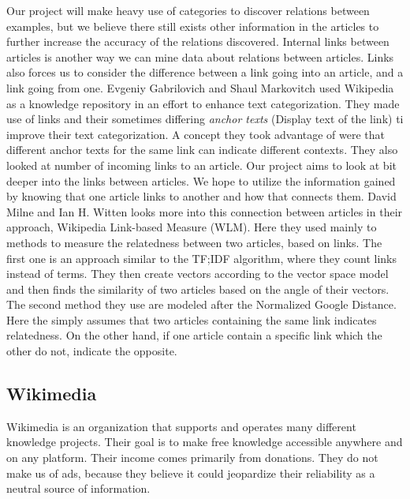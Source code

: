 Our project will make heavy use of categories to discover relations between examples, but we believe there still exists other information in the articles to further increase the accuracy of the relations discovered. Internal links between articles is another way we can mine data about relations between articles. Links also forces us to consider the difference between a link going into an article, and a link going from one. Evgeniy Gabrilovich and Shaul Markovitch used Wikipedia as a knowledge repository in an effort to enhance text categorization\cite{text-cat}. They made use of links and their sometimes differing \textit{anchor texts} (Display text of the link) ti improve their text categorization. A concept they took advantage of were that different anchor texts for the same link can indicate different contexts.  They also looked at number of incoming links to an article. Our project aims to look at bit deeper into the links between articles. We hope to utilize the information gained by knowing that one article links to another and how that connects them. David Milne and Ian H. Witten looks more into this connection between articles in their approach,  Wikipedia Link-based Measure (WLM)\cite{wlm}. Here they used mainly to methods to measure the relatedness between two articles, based on links. The first one is an approach similar to the TF;IDF algorithm, where they count links instead of terms. They then create vectors according to the vector space model and then finds the similarity of two articles based on the angle of their vectors. The second method they use are modeled after the Normalized Google Distance\cite{gsd}. Here the simply assumes that two articles containing the same link indicates relatedness. On the other hand, if one article contain a specific link which the other do not, indicate the opposite.



\subsection{Wikimedia} \label{wikimedia}
Wikimedia\cite{wikimedia} is an organization that supports and operates many different knowledge projects. Their goal is to make free knowledge accessible anywhere and on any platform. Their income comes primarily from donations. They do not make us of ads, because they believe it could jeopardize their reliability as a neutral source of information.

